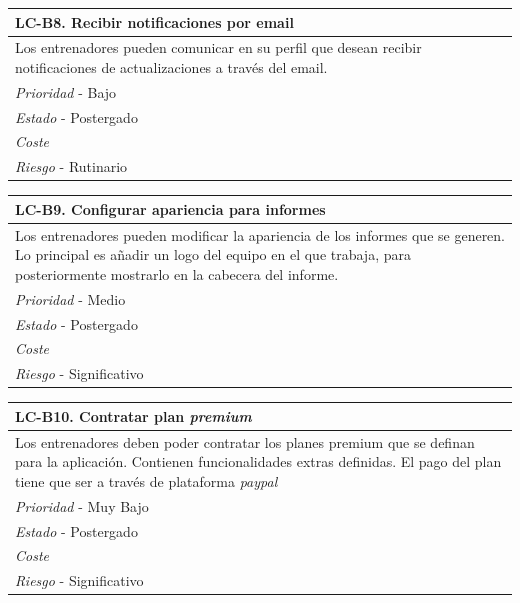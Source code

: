	\begin{center}
		\begin{tabularx}{15cm}{|X|}
			\hline 
				\bf{LC-B8. Recibir notificaciones por email}\\
			\hline
				Los entrenadores pueden comunicar en su perfil que desean recibir notificaciones de actualizaciones a través del email.\\
			\hline
				{\it Prioridad} - Bajo\\
			\hline
				{\it Estado} - Postergado\\
			\hline
				{\it Coste}\\
			\hline
				{\it Riesgo} - Rutinario\\
			\hline
		\end{tabularx}
	\end{center}
	
	\begin{center}
		\begin{tabularx}{15cm}{|X|}
			\hline 
				\bf{LC-B9. Configurar apariencia para informes}\\
			\hline
				Los entrenadores pueden modificar la apariencia de los informes que se generen. Lo principal es añadir un logo del equipo en el que trabaja, para posteriormente mostrarlo en la cabecera del informe.\\
			\hline
				{\it Prioridad} - Medio\\
			\hline
				{\it Estado} - Postergado\\
			\hline
				{\it Coste}\\
			\hline
				{\it Riesgo} - Significativo\\
			\hline
		\end{tabularx}
	\end{center}
	
	\begin{center}
		\begin{tabularx}{15cm}{|X|}
			\hline 
				\bf{LC-B10. Contratar plan \it{premium}}\\
			\hline
				Los entrenadores deben poder contratar los planes premium que se definan para la aplicación. Contienen funcionalidades extras definidas. El pago del plan tiene que ser a través de plataforma \it{paypal}\\
			\hline
				{\it Prioridad} - Muy Bajo\\
			\hline
				{\it Estado} - Postergado\\
			\hline
				{\it Coste}\\
			\hline
				{\it Riesgo} - Significativo\\
			\hline
		\end{tabularx}
	\end{center}
	
